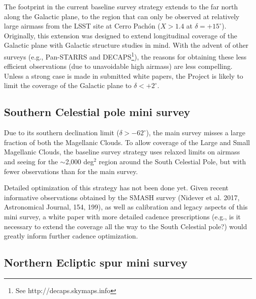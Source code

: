 \documentclass[DM,lsstdraft,toc,usenatbib]{lsstdoc}
\begin{document}
The footprint in the current baseline survey strategy extends to the far north along the Galactic
plane, to the region that can only be observed at relatively large airmass from the LSST
site at Cerro Pach\'on ($X>1.4$ at $\delta  = +15^\circ$). Originally, this extension was designed 
to extend longitudinal coverage of the Galactic plane with Galactic structure studies in mind. 
With the advent of other surveys (e.g., Pan-STARRS and DECAPS\footnote{See http://decaps.skymaps.info}), 
the reasons for obtaining these less efficient observations (due to unavoidable high airmass) are less compelling. 
Unless a strong case is made in submitted white papers, the Project is likely to limit the 
coverage of the Galactic plane to $\delta < +2^\circ$. 


\subsection{Southern Celestial pole mini survey}

Due to its southern declination limit ($\delta > -62^\circ$), the main survey misses a large fraction
of both the Magellanic Clouds. To allow coverage of the Large and Small Magellanic Clouds, the 
baseline survey strategy uses relaxed limits on airmass and seeing for the $\sim$2,000 deg$^2$ region 
around the South Celestial Pole, but with fewer observations than for the main survey. 

Detailed optimization of this strategy has not been done yet. Given recent informative observations 
obtained by the SMASH survey (Nidever et al. 2017, Astronomical Journal, 154, 199), as well as calibration 
and legacy aspects of this mini survey, a white paper with more detailed cadence prescriptions
(e.g., is it necessary to extend the coverage all the way to the South Celestial pole?) would greatly 
inform further cadence optimization. 


\subsection{Northern Ecliptic spur mini survey}
\end{document}
